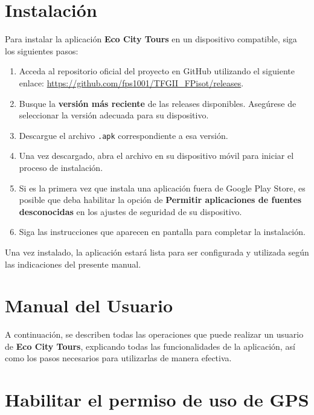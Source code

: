 \section{Instalación}

Para instalar la aplicación \textbf{Eco City Tours} en un dispositivo compatible, siga los siguientes pasos:

\begin{enumerate}
	\item Acceda al repositorio oficial del proyecto en GitHub utilizando el siguiente enlace: 
	\url{https://github.com/fps1001/TFGII_FPisot/releases}.
	\item Busque la \textbf{versión más reciente} de las releases disponibles. Asegúrese de seleccionar la versión adecuada para su dispositivo.
	\item Descargue el archivo \texttt{.apk} correspondiente a esa versión.
	\item Una vez descargado, abra el archivo en su dispositivo móvil para iniciar el proceso de instalación.
	\item Si es la primera vez que instala una aplicación fuera de Google Play Store, es posible que deba habilitar la opción de \textbf{Permitir aplicaciones de fuentes desconocidas} en los ajustes de seguridad de su dispositivo.
	\item Siga las instrucciones que aparecen en pantalla para completar la instalación.
\end{enumerate}

Una vez instalado, la aplicación estará lista para ser configurada y utilizada según las indicaciones del presente manual.

\section{Manual del Usuario}
A continuación, se describen todas las operaciones que puede realizar un usuario de \textbf{Eco City Tours}, explicando todas las funcionalidades de la aplicación, así como los pasos necesarios para utilizarlas de manera efectiva.

\section{Habilitar el permiso de uso de GPS}


